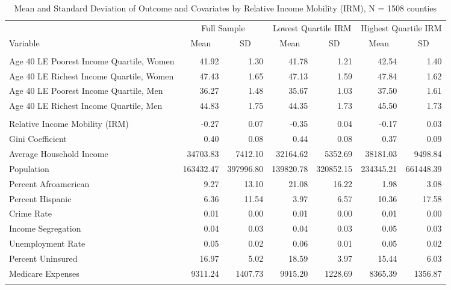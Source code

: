 \begin{table}[htp]
\centering
\caption{Mean and Standard Deviation of Outcome and Covariates \newline by Relative Income Mobility (IRM), N = 1508 counties} 
\label{tab:descriptives}
\begingroup\scriptsize
\begin{tabular}{lrrrrrr}
  \hline
\addlinespace
& \multicolumn{2}{c}{Full Sample} & \multicolumn{2}{c}{Lowest Quartile IRM} & \multicolumn{2}{c}{Highest Quartile IRM}  \\
Variable & \multicolumn{1}{c}{Mean} & \multicolumn{1}{c}{SD} & \multicolumn{1}{c}{Mean} & \multicolumn{1}{c}{SD} & \multicolumn{1}{c}{Mean} & \multicolumn{1}{c}{SD} \\
\addlinespace
 \hline
  \addlinespace
\multicolumn{7}{l}{\textit{Outcome}} \\
\addlinespace
Age 40 LE Poorest Income Quartile, Women & 41.92 & 1.30 & 41.78 & 1.21 & 42.54 & 1.40 \\ 
  Age 40 LE Richest Income Quartile, Women & 47.43 & 1.65 & 47.13 & 1.59 & 47.84 & 1.62 \\ 
  Age 40 LE Poorest Income Quartile, Men & 36.27 & 1.48 & 35.67 & 1.03 & 37.50 & 1.61 \\ 
  Age 40 LE Richest Income Quartile, Men & 44.83 & 1.75 & 44.35 & 1.73 & 45.50 & 1.73 \\ 
   \addlinespace
\multicolumn{7}{l}{\textit{Covariates}} \\
\addlinespace
Relative Income Mobility (IRM) & -0.27 & 0.07 & -0.35 & 0.04 & -0.17 & 0.03 \\ 
  Gini Coefficient & 0.40 & 0.08 & 0.44 & 0.08 & 0.37 & 0.09 \\ 
  Average Household Income & 34703.83 & 7412.10 & 32164.62 & 5352.69 & 38181.03 & 9498.84 \\ 
  Population & 163432.47 & 397996.80 & 139820.78 & 320852.15 & 234345.21 & 661448.39 \\ 
  Percent Afroamerican & 9.27 & 13.10 & 21.08 & 16.22 & 1.98 & 3.08 \\ 
  Percent Hispanic & 6.36 & 11.54 & 3.97 & 6.57 & 10.36 & 17.58 \\ 
  Crime Rate & 0.01 & 0.00 & 0.01 & 0.00 & 0.01 & 0.00 \\ 
  Income Segregation & 0.04 & 0.03 & 0.04 & 0.03 & 0.05 & 0.03 \\ 
  Unemployment Rate & 0.05 & 0.02 & 0.06 & 0.01 & 0.05 & 0.02 \\ 
  Percent Uninsured & 16.97 & 5.02 & 18.59 & 3.97 & 15.44 & 6.03 \\ 
  Medicare Expenses & 9311.24 & 1407.73 & 9915.20 & 1228.69 & 8365.39 & 1356.87 \\ 
   \addlinespace
\hline
\addlinespace
\end{tabular}
\endgroup
\end{table}
